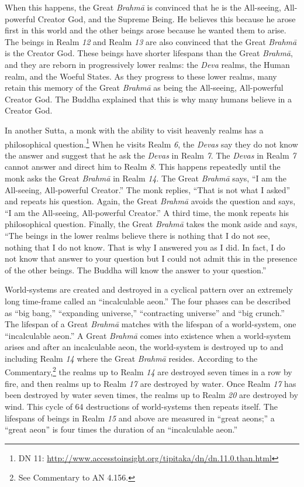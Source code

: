 When this happens, the Great \textit{Brahmā} is convinced that he is the All-seeing, All-powerful Creator God, and the Supreme Being. He believes this because he arose first in this world and the other beings arose because he wanted them to arise. The beings in Realm \textit{12} and Realm \textit{13} are also convinced that the Great \textit{Brahmā} is the Creator God. These beings have shorter lifespans than the Great \textit{Brahmā}, and they are reborn in progressively lower realms: the \textit{Deva} realms, the Human realm, and the Woeful States. As they progress to these lower realms, many retain this memory of the Great \textit{Brahmā} as being the All-seeing, All-powerful Creator God. The Buddha explained that this is why many humans believe in a Creator God.

In another Sutta, a monk with the ability to visit heavenly realms has a philosophical question.\footnote{DN 11: \url{http://www.accesstoinsight.org/tipitaka/dn/dn.11.0.than.html}} When he visits Realm \textit{6}, the \textit{Devas} say they do not know the answer and suggest that he ask the \textit{Devas} in Realm \textit{7}. The \textit{Devas} in Realm \textit{7} cannot answer and direct him to Realm \textit{8}. This happens repeatedly until the monk asks the Great \textit{Brahmā} in Realm \textit{14}. The Great \textit{Brahmā} says, “I am the All-seeing, All-powerful Creator.” The monk replies, “That is not what I asked” and repeats his question. Again, the Great \textit{Brahmā} avoids the question and says, “I am the All-seeing, All-powerful Creator.” A third time, the monk repeats his philosophical question. Finally, the Great \textit{Brahmā} takes the monk aside and says, “The beings in the lower realms believe there is nothing that I do not see, nothing that I do not know. That is why I answered you as I did. In fact, I do not know that answer to your question but I could not admit this in the presence of the other beings. The Buddha will know the answer to your question.”

World-systems are created and destroyed in a cyclical pattern over an extremely long time-frame called an “incalculable aeon.” The four phases can be described as “big bang,” “expanding universe,” “contracting universe” and “big crunch.” The lifespan of a Great \textit{Brahmā} matches with the lifespan of a world-system, one “incalculable aeon.” A Great \textit{Brahmā} comes into existence when a world-system arises and after an incalculable aeon, the world-system is destroyed up to and including Realm \textit{14} where the Great \textit{Brahmā} resides. According to the Commentary,\footnote{See Commentary to AN 4.156.} the realms up to Realm \textit{14} are destroyed seven times in a row by fire, and then realms up to Realm \textit{17} are destroyed by water. Once Realm \textit{17} has been destroyed by water seven times, the realms up to Realm \textit{20} are destroyed by wind. This cycle of 64 destructions of world-systems then repeats itself. The lifespans of beings in Realm \textit{15} and above are measured in “great aeons;” a “great aeon” is four times the duration of an “incalculable aeon.”

